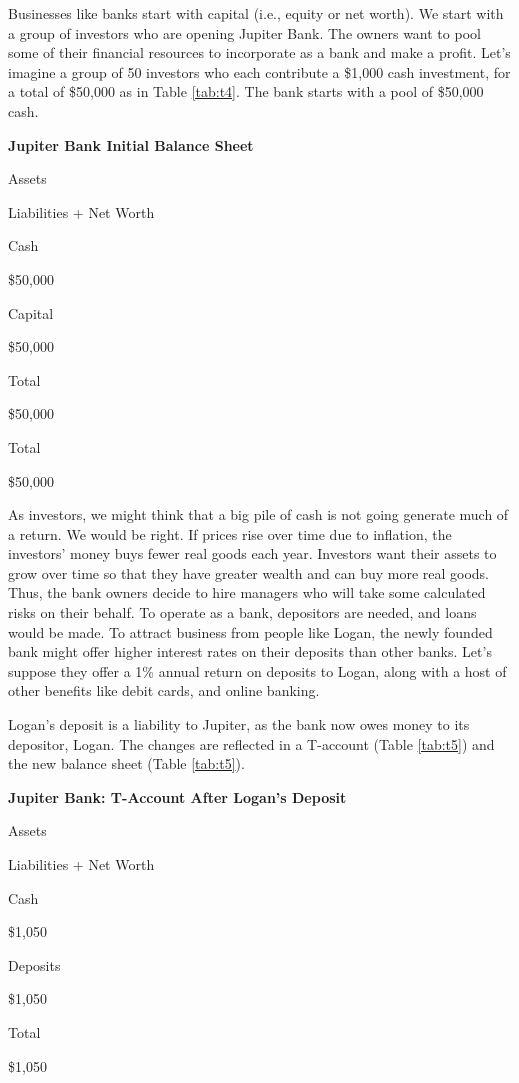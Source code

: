 \documentclass[
]{book}
\begin{document}
Businesses like banks start with capital (i.e., equity or net worth). We start with a group of investors who are opening Jupiter Bank. The owners want to pool some of their financial resources to incorporate as a bank and make a profit. Let's imagine a group of 50 investors who each contribute a \$1,000 cash investment, for a total of \$50,000 as in Table \ref{tab:t4}. The bank starts with a pool of \$50,000 cash.

\label{tab:t4}\textbf{Jupiter Bank Initial Balance Sheet}

Assets

Liabilities + Net Worth

Cash

\$50,000

Capital

\$50,000

Total

\$50,000

Total

\$50,000

As investors, we might think that a big pile of cash is not going generate much of a return. We would be right. If prices rise over time due to inflation, the investors' money buys fewer real goods each year. Investors want their assets to grow over time so that they have greater wealth and can buy more real goods. Thus, the bank owners decide to hire managers who will take some calculated risks on their behalf. To operate as a bank, depositors are needed, and loans would be made. To attract business from people like Logan, the newly founded bank might offer higher interest rates on their deposits than other banks. Let's suppose they offer a 1\% annual return on deposits to Logan, along with a host of other benefits like debit cards, and online banking.

Logan's deposit is a liability to Jupiter, as the bank now owes money to its depositor, Logan. The changes are reflected in a T-account (Table \ref{tab:t5}) and the new balance sheet (Table \ref{tab:t5}).

\label{tab:t5}\textbf{Jupiter Bank: T-Account After Logan's Deposit}

Assets

Liabilities + Net Worth

Cash

\$1,050

Deposits

\$1,050

Total

\$1,050
\end{document}
